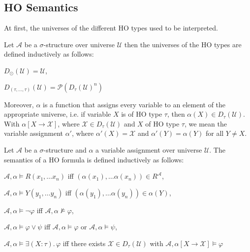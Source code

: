 \subsection{HO Semantics}\label{subsec:hoSemantics}

At first, the universes of the different HO types used to be interpreted.

\begin{definition}
    Let $\mathcal{A}$ be a $\sigma$-structure over universe $\mathcal{U}$ then the universes of the
    HO types are defined inductively as follows:
    \begin{compactitem}
        \item $D_\odot(\mathcal{U}) = \mathcal{U}$,
        \item $D_{(\tau, \dots, \tau)}(\mathcal{U}) = \mathcal{P}(D_{\tau}(\mathcal{U})^n)$
    \end{compactitem}
\end{definition}

Moreover, $\alpha$ is a function that assigns every variable to an element of the appropriate universe, i.e. if
variable $X$ is of HO type $\tau$, then $\alpha(X) \in D_{\tau}(\mathcal{U})$. With $\alpha[X \rightarrow \mathcal{X}]$,
where $\mathcal{X} \in D_\tau(\mathcal{U})$ and $X$ of HO type $\tau$, we mean the variable assignment $\alpha'$,
where $\alpha'(X) = \mathcal{X}$ and $\alpha'(Y) = \alpha(Y)$ for all $Y \neq X$.

\begin{definition}
    Let $\mathcal{A}$ be a $\sigma$-structure and $\alpha$ a variable assignment over universe $\mathcal{U}$. The
    semantics of a HO formula is defined inductively as follows:
    \begin{compactitem}
        \item $\mathcal{A}, \alpha \models R(x_1, \dots x_n)$ iff $(\alpha(x_1), \dots
        \alpha(x_n)) \in R^{\mathcal{A}}$,
        \item $\mathcal{A}, \alpha \models Y(y_1, \dots y_n)$ iff $(\alpha(y_1), \dots
        \alpha(y_n)) \in \alpha(Y)$,
        \item $\mathcal{A}, \alpha \models \neg\varphi$ iff $\mathcal{A}, \alpha\not\models\varphi$,
        \item $\mathcal{A}, \alpha \models \varphi \vee \psi$ iff $\mathcal{A}, \alpha\models\varphi$ or $\mathcal{A},
        \alpha\models\psi$,
        \item $\mathcal{A}, \alpha \models \exists (X\colon\tau).\,\varphi$ iff there exists $\mathcal{X} \in D_{\tau}
        (\mathcal{U})$ with $\mathcal{A}, \alpha[X \rightarrow \mathcal{X}] \models \varphi$
        \end{compactitem}
\end{definition}

